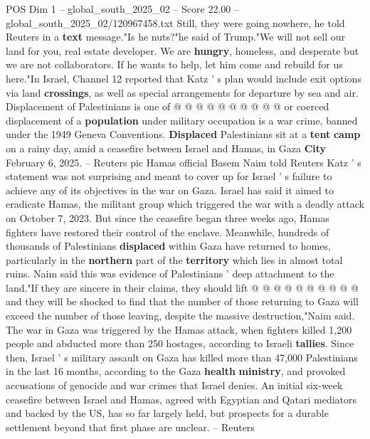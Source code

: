 \begin{textsample}{POS Dim 1 – global\_south\_2025\_02 – Score 22.00 – global\_south\_2025\_02/120967458.txt}
Still, they were going nowhere, he told Reuters in a \textbf{text} message."Is he nuts?"he said of Trump."We will not sell our land for you, real estate developer.
We are \textbf{hungry}, homeless, and desperate but we are not collaborators.
If he wants to help, let him come and rebuild for us here."In Israel, Channel 12 reported that Katz ' s plan would include exit options via land \textbf{crossings}, as well as special arrangements for departure by sea and air.
Displacement of Palestinians is one of @ @ @ @ @ @ @ @ @ @ or coerced displacement of a \textbf{population} under military occupation is a war crime, banned under the 1949 Geneva Conventions. \textbf{Displaced} Palestinians sit at a \textbf{tent} \textbf{camp} on a rainy day, amid a ceasefire between Israel and Hamas, in Gaza \textbf{City} February 6, 2025. -- Reuters pic Hamas official Basem Naim told Reuters Katz ' s statement was not surprising and meant to cover up for Israel ' s failure to achieve any of its objectives in the war on Gaza.
Israel has said it aimed to eradicate Hamas, the militant group which triggered the war with a deadly attack on October 7, 2023.
But since the ceasefire began three weeks ago, Hamas fighters have restored their control of the enclave.
Meanwhile, hundreds of thousands of Palestinians \textbf{displaced} within Gaza have returned to homes, particularly in the \textbf{northern} part of the \textbf{territory} which lies in almost total ruins.
Naim said this was evidence of Palestinians ' deep attachment to the land."If they are sincere in their claims, they should lift @ @ @ @ @ @ @ @ @ @ and they will be shocked to find that the number of those returning to Gaza will exceed the number of those leaving, despite the massive destruction,"Naim said.
The war in Gaza was triggered by the Hamas attack, when fighters killed 1,200 people and abducted more than 250 hostages, according to Israeli \textbf{tallies}.
Since then, Israel ' s military assault on Gaza has killed more than 47,000 Palestinians in the last 16 months, according to the Gaza \textbf{health} \textbf{ministry}, and provoked accusations of genocide and war crimes that Israel denies.
An initial six-week ceasefire between Israel and Hamas, agreed with Egyptian and Qatari mediators and backed by the US, has so far largely held, but prospects for a durable settlement beyond that first phase are unclear. -- Reuters

\end{textsample}
